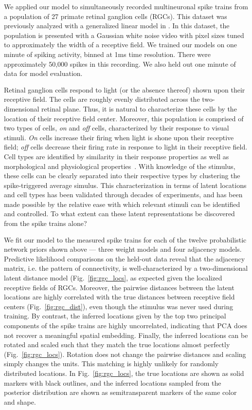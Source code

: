 We applied our model to simultaneously recorded multineuronal spike
trains from a population of 27 primate retinal ganglion cells
(RGCs). This dataset was previously analyzed with a generalized linear
model in \cite{Pillow-2008}.  In this
dataset, the population is presented with a Gaussian white noise video
with pixel sizes tuned to approximately the width of a receptive
field. We trained our models on one minute of spiking activity, binned at 1ms time
resolution. There were approximately 50,000 spikes in this recording.
We also held out one minute of data for model evaluation.

Retinal ganglion cells respond to light (or the absence thereof) shown
upon their receptive field. The cells are roughly evenly distributed
across the two-dimensional retinal plane. Thus, it is natural to
characterize these cells by the location of their receptive field
center.  Moreover, this population is comprised of two types of cells,
\textit{on} and \textit{off} cells, characterized by their response to
visual stimuli. \textit{On} cells increase their firing when light is
shone upon their receptive field; \textit{off} cells decrease their
firing rate in response to light in their receptive field.  Cell types
are identified by similarity in their response properties as well as
morphological and physiological properties~\cite{sanes2015types}. With
knowledge of the stimulus, these cells can be clearly separated into
their respective types by clustering the spike-triggered average
simulus.  This characterization in terms of latent locations and cell
types has been validated through decades of experiments, and has been
made possible by the relative ease with which relevant stimuli can be
identified and controlled. To what extent can these latent
representations be discovered from the spike trains alone?

We fit our model to the measured spike trains for each of the twelve
probabilistic network priors shown above --- three weight models and
four adjacency models. Predictive likelihood comparisons on the
held-out data reveal that the adjacency matrix, i.e. the pattern of
connectivity, is well-characterized by a two-dimensional latent
distance model (Fig.~\ref{fig:rgc_locs}, as expected given the
localized receptive fields of RGCs. Moreover, the pairwise distances
between the latent locations are highly correlated with the true
distances between receptive field centers (Fig.~\ref{fig:rgc_dist}),
even though the stimulus was never used during training. By contrast,
the inferred locations given by the top two principal components of
the spike trains are highly uncorrelated, indicating that PCA does not
recover a meaningful spatial embedding.  Finally, the inferred
locations can be rotated and scaled such that they match the true
locations almost perfectly (Fig.~\ref{fig:rgc_locs}). Rotation does
not change the pairwise distances and scaling simply changes the
units. This matching is highly unlikely for randomly distributed
locations.  In Fig.~\ref{fig:rgc_locs}, the true locations are shown
as solid markers with black outlines, and the inferred locations
sampled from the posterior distribution are shown as semitransparent
markers of the same color and shape.

